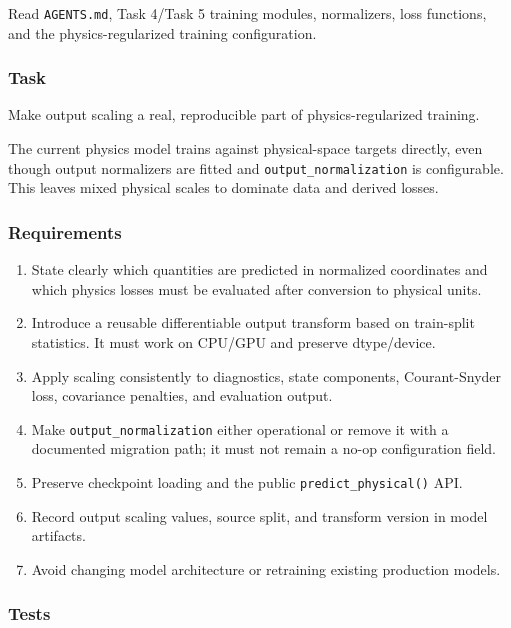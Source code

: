\documentclass[
]{article}
\providecommand{\tightlist}{%
  \setlength{\itemsep}{0pt}\setlength{\parskip}{0pt}}
\begin{document}
Read \texttt{AGENTS.md}, Task 4/Task 5 training modules, normalizers,
loss functions, and the physics-regularized training configuration.

\hypertarget{task-3}{%
\subsubsection{Task}\label{task-3}}

Make output scaling a real, reproducible part of physics-regularized
training.

The current physics model trains against physical-space targets
directly, even though output normalizers are fitted and
\texttt{output\_normalization} is configurable. This leaves mixed
physical scales to dominate data and derived losses.

\hypertarget{requirements-3}{%
\subsubsection{Requirements}\label{requirements-3}}

\begin{enumerate}
\def\labelenumi{\arabic{enumi}.}
\tightlist
\item
  State clearly which quantities are predicted in normalized coordinates
  and which physics losses must be evaluated after conversion to
  physical units.
\item
  Introduce a reusable differentiable output transform based on
  train-split statistics. It must work on CPU/GPU and preserve
  dtype/device.
\item
  Apply scaling consistently to diagnostics, state components,
  Courant-Snyder loss, covariance penalties, and evaluation output.
\item
  Make \texttt{output\_normalization} either operational or remove it
  with a documented migration path; it must not remain a no-op
  configuration field.
\item
  Preserve checkpoint loading and the public
  \texttt{predict\_physical()} API.
\item
  Record output scaling values, source split, and transform version in
  model artifacts.
\item
  Avoid changing model architecture or retraining existing production
  models.
\end{enumerate}

\hypertarget{tests-3}{%
\subsubsection{Tests}\label{tests-3}}
\end{document}

